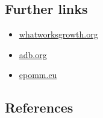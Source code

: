 \documentclass[
]{book}
\providecommand{\tightlist}{%
  \setlength{\itemsep}{0pt}\setlength{\parskip}{0pt}}
\begin{document}
\hypertarget{further-links-5}{%
\subsection*{Further links}\label{further-links-5}}

\begin{itemize}
\tightlist
\item
  \href{https://whatworksgrowth.org/policy-reviews/transport/congestion-charging}{whatworksgrowth.org}
\item
  \href{https://www.adb.org/sites/default/files/publication/159940/introduction-congestion-charging.pdf}{adb.org}
\item
  \href{http://www.epomm.eu/newsletter/v2/content/2015/0415/doc/eupdate_en.pdf}{epomm.eu}
\end{itemize}

\hypertarget{references-6}{%
\subsection*{References}\label{references-6}}
\end{document}
